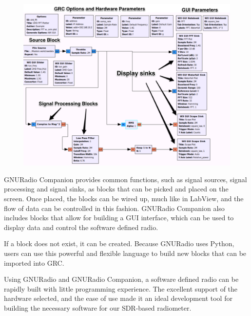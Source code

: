 {\begin{figure}[h!tb] \centering
\includegraphics[width=\textwidth]{Images/radiometer_power_grc.pdf}
\label{N200_GRC}
\end{figure}
}

GNURadio Companion provides common functions, such as signal sources, signal processing and signal sinks, as blocks that can be picked and placed on the screen.  Once placed, the blocks can be wired up, much like in LabView, and the flow of data can be controlled in this fashion.  GNURadio Companion also includes blocks that allow for building a GUI interface, which can be used to display data and control the software defined radio.

If a block does not exist, it can be created.  Because GNURadio uses Python, users can use this powerful and flexible language to build new blocks that can be imported into GRC.    

Using GNURadio and GNURadio Companion, a software defined radio can be rapidly built with little programming experience.  The excellent support of the hardware selected, and the ease of use made it an ideal development tool for building the necessary software for our SDR-based radiometer.

